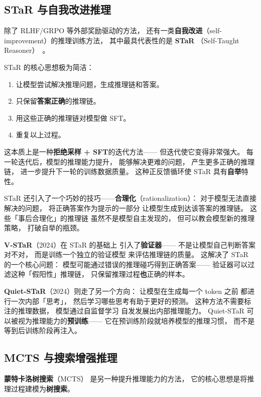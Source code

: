 \subsection{STaR 与自我改进推理}

除了 RLHF/GRPO 等外部奖励驱动的方法，
还有一类\textbf{自我改进}（self-improvement）的推理训练方法，
其中最具代表性的是 \textbf{STaR}
（Self-Taught Reasoner）~\cite{zelikman2022star}。

STaR 的核心思想极为简洁：
\begin{enumerate}[noitemsep]
  \item 让模型尝试解决推理问题，生成推理链和答案。
  \item 只保留\textbf{答案正确}的推理链。
  \item 用这些正确的推理链对模型做 SFT。
  \item 重复以上过程。
\end{enumerate}

这本质上是一种\textbf{拒绝采样 + SFT}的迭代方法——
但迭代使它变得非常强大。
每一轮迭代后，模型的推理能力提升，
能够解决更难的问题，
产生更多正确的推理链，
进一步提升下一轮的训练数据质量。
这种正反馈循环使 STaR 具有\textbf{自举}特性。

STaR 还引入了一个巧妙的技巧——\textbf{合理化}（rationalization）：
对于模型无法直接解决的问题，
将正确答案作为提示的一部分
让模型生成到达该答案的推理链。
这些「事后合理化」的推理链
虽然不是模型自主发现的，
但可以教会模型新的推理策略，
打破自举的瓶颈。

\textbf{V-STaR}（2024）在 STaR 的基础上
引入了\textbf{验证器}——
不是让模型自己判断答案对不对，
而是训练一个独立的验证模型
来评估推理链的质量。
这解决了 STaR 的一个核心问题：
模型可能通过错误的推理碰巧得到正确答案——
验证器可以过滤这种「假阳性」推理链，
只保留推理过程\textbf{也}正确的样本。

\textbf{Quiet-STaR}（2024）则走了另一个方向：
让模型在生成每一个 token 之前
都进行一次内部「思考」，
然后学习哪些思考有助于更好的预测。
这种方法不需要标注的推理数据，
模型通过自监督学习
自发发展出内部推理能力。
Quiet-STaR 可以被视为推理能力的\textbf{预训练}——
它在预训练阶段就培养模型的推理习惯，
而不是等到后训练阶段再注入。

\subsection{MCTS 与搜索增强推理}

\textbf{蒙特卡洛树搜索}（MCTS）
是另一种提升推理能力的方法，
它的核心思想是将推理过程建模为\textbf{树搜索}。

